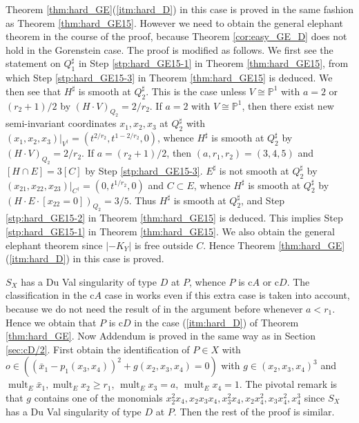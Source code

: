 \documentclass[a4paper,11pt]{amsart}
\theoremstyle{definition}
\theoremstyle{remark}
\numberwithin{equation}{section}
\newcommand{\bP}{{\mathbb P}}
\newcommand{\mult}{\operatorname{mult}}
\newcommand{\system}[1]{\left|{#1}\right|}
\begin{document}
Theorem \ref{thm:hard_GE}(\ref{itm:hard_D}) in this case is proved
in the same fashion as Theorem \ref{thm:hard_GE15}.
However we need to obtain the general elephant theorem
in the course of the proof,
because Theorem \ref{cor:easy_GE_D} does not hold in the Gorenstein case.
The proof is modified as follows.
We first see the statement on $Q_1^\sharp$
in Step \ref{stp:hard_GE15-1} in Theorem \ref{thm:hard_GE15},
from which Step \ref{stp:hard_GE15-3} in Theorem \ref{thm:hard_GE15}
is deduced.
We then see that $H^\sharp$ is smooth at $Q_2^\sharp$.
This is the case unless $V\cong\bP^1$ with $a=2$ or $(r_2+1)/2$
by $(H \cdot V)_{Q_2}=2/r_2$.
If $a=2$ with $V\cong\bP^1$,
then there exist new semi-invariant coordinates $x_1,x_2,x_3$ at $Q_2^\sharp$
with $(x_1,x_2,x_3)|_{V^\dag}=(t^{2/r_2},t^{1-2/r_2},0)$,
whence $H^\sharp$ is smooth at $Q_2^\sharp$ by $(H \cdot V)_{Q_2}=2/r_2$.
If $a=(r_2+1)/2$,
then $(a,r_1,r_2)=(3,4,5)$ and $[H \cap E]=3[C]$ by Step \ref{stp:hard_GE15-3}.
$E^\sharp$ is not smooth at $Q_2^\sharp$
by $(x_{21},x_{22},x_{23})|_{C^\dag}=(0,t^{1/r_2},0)$ and $C \subset E$,
whence $H^\sharp$ is smooth at $Q_2^\sharp$
by $(H \cdot E \cdot [x_{22}=0])_{Q_2}=3/5$.
Thus $H^\sharp$ is smooth at $Q_2^\sharp$,
and Step \ref{stp:hard_GE15-2} in Theorem \ref{thm:hard_GE15} is deduced.
This implies Step \ref{stp:hard_GE15-1} in Theorem \ref{thm:hard_GE15}.
We also obtain the general elephant theorem
since $\system{-K_Y}$ is free outside $C$.
Hence Theorem \ref{thm:hard_GE}(\ref{itm:hard_D}) in this case is proved.

$S_X$ has a Du Val singularity of type $D$ at $P$,
whence $P$ is c$A$ or c$D$.
The classification in the c$A$ case in \cite[Section 6]{Ka03} works
even if this extra case is taken into account,
because we do not need the result of \cite[Section 5]{Ka03}
in the argument before \cite[Lemma 6.6]{Ka03} whenever $a<r_1$.
Hence we obtain that $P$ is c$D$
in the case (\ref{itm:hard_D}) of Theorem \ref{thm:hard_GE}.
Now Addendum is proved in the same way as in Section \ref{sec:cD/2}.
First obtain the identification of $P \in X$ with
$o \in ((\bar{x}_1-p_1(x_3,x_4))^2+g(x_2,x_3,x_4)=0)$
with $g\in(x_2,x_3,x_4)^3$ and $\mult_E \bar{x}_1, \mult_E x_2\ge r_1$,
$\mult_E x_3=a$, $\mult_E x_4=1$.
The pivotal remark is that $g$ contains one of the monomials
$x_2^2x_4,x_2x_3x_4,x_3^2x_4,x_2x_4^2,x_3x_4^2,x_4^3$
since $S_X$ has a Du Val singularity of type $D$ at $P$.
Then the rest of the proof is similar.
\end{document}
